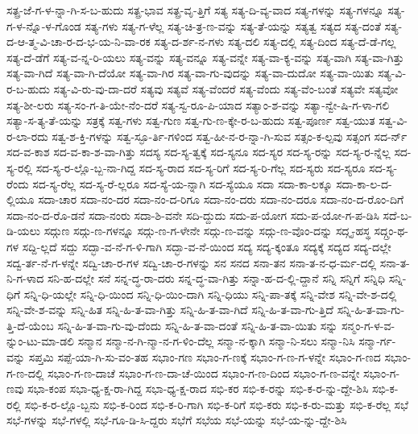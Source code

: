 {ಸತ್ಪ್ರ-ಜೆ-ಗ-ಳ-ನ್ನಾ-ಗಿ-ಸ-ಬ-ಹುದು
ಸತ್ಪ್ರ-ಭಾವ
ಸತ್ಪ್ರ-ವೃ-ತ್ತಿಗೆ
ಸತ್ಯ
ಸತ್ಯ-ದಿ-ವ್ಯ-ವಾದ
ಸತ್ಯ-ಗಳನ್ನು
ಸತ್ಯ-ಗಳನ್ನೂ
ಸತ್ಯ-ಗ-ಳ-ನ್ನೊ-ಳ-ಗೊಂಡ
ಸತ್ಯ-ಗಳು
ಸತ್ಯ-ಗ-ಳೆಲ್ಲ
ಸತ್ಯ-ಚಿ-ತ್ರ-ಣ-ವನ್ನು
ಸತ್ಯ-ತೆ-ಯನ್ನು
ಸತ್ಯತ್ವ
ಸತ್ಯದ
ಸತ್ಯ-ದಂತೆ
ಸತ್ಯ-ದ-ಆ-ತ್ಮ-ವಿ-ಚಾ-ರ-ದ-ಭ-ಯ-ನಿ-ವಾ-ರಕ
ಸತ್ಯ-ದ-ರ್ಶ-ನ-ಗಳು
ಸತ್ಯ-ದಲಿ
ಸತ್ಯ-ದಲ್ಲಿ
ಸತ್ಯ-ದಿಂದ
ಸತ್ಯ-ದೆ-ಡೆ-ಗಲ್ಲ
ಸತ್ಯ-ದೆ-ಡೆಗೆ
ಸತ್ಯ-ವ-ನ್ನ-ರಿ-ಯಲು
ಸತ್ಯ-ವನ್ನು
ಸತ್ಯ-ವನ್ನೂ
ಸತ್ಯ-ವನ್ನೇ
ಸತ್ಯ-ವಾ-ಕ್ಯ-ವನ್ನು
ಸತ್ಯ-ವಾಗಿ
ಸತ್ಯ-ವಾ-ಗಿತ್ತು
ಸತ್ಯ-ವಾ-ಗಿದೆ
ಸತ್ಯ-ವಾ-ಗಿ-ದೆಯೋ
ಸತ್ಯ-ವಾ-ಗಿರ
ಸತ್ಯ-ವಾ-ಗು-ವುದನ್ನು
ಸತ್ಯ-ವಾ-ದುದೋ
ಸತ್ಯ-ವಾ-ಯಿತು
ಸತ್ಯ-ವಿ-ರ-ಬ-ಹುದು
ಸತ್ಯ-ವಿ-ರು-ವು-ದಾ-ದರೆ
ಸತ್ಯವು
ಸತ್ಯವೆ
ಸತ್ಯ-ವೆಂದರೆ
ಸತ್ಯ-ವೆಂದು
ಸತ್ಯ-ವೆಂ-ಬಂತೆ
ಸತ್ಯವೇ
ಸತ್ಯವೋ
ಸತ್ಯ-ಶೀ-ಲರು
ಸತ್ಯ-ಸಂ-ಗ-ತಿ-ಯೇ-ನೆಂ-ದರೆ
ಸತ್ಯ-ಸ್ವ-ರೂ-ಪಿ-ಯಾದ
ಸತ್ಯಾಂ-ಶ-ವನ್ನು
ಸತ್ಯಾ-ನ್ವೇ-ಷಿ-ಗ-ಳಾ-ಗಲಿ
ಸತ್ಯಾ-ಸ-ತ್ಯ-ತೆ-ಯನ್ನು
ಸತ್ರಕ್ಕೆ
ಸತ್ವ-ಗಳು
ಸತ್ವ-ಗುಣ
ಸತ್ವ-ಗು-ಣ-ಕ್ಕೇ-ರ-ಬ-ಹುದು
ಸತ್ವ-ಪೂರ್ಣ
ಸತ್ವ-ಯುತ
ಸತ್ವ-ವಿ-ರ-ಲಾ-ರದು
ಸತ್ವ-ಶ-ಕ್ತಿ-ಗಳನ್ನು
ಸತ್ವ-ಸ್ಫೂ-ರ್ತಿ-ಗಳಿಂದ
ಸತ್ವ-ಹೀ-ನ-ರ-ನ್ನಾ-ಗಿ-ಸುವ
ಸತ್ಸಂ-ಕ-ಲ್ಪವು
ಸತ್ಸಂಗ
ಸದ-ರ್ನ್
ಸದ-ವ-ಕಾಶ
ಸದ-ವ-ಕಾ-ಶ-ವಾ-ಗಿತ್ತು
ಸದಸ್ಯ
ಸದ-ಸ್ಯ-ತ್ವಕ್ಕೆ
ಸದ-ಸ್ಯನೂ
ಸದ-ಸ್ಯರ
ಸದ-ಸ್ಯ-ರನ್ನು
ಸದ-ಸ್ಯ-ರ-ನ್ನೆಲ್ಲ
ಸದ-ಸ್ಯ-ರಲ್ಲಿ
ಸದ-ಸ್ಯ-ರ-ಲ್ಲೊ-ಬ್ಬ-ನಾ-ಗಿದ್ದ
ಸದ-ಸ್ಯ-ರಾದ
ಸದ-ಸ್ಯ-ರಿಗೆ
ಸದ-ಸ್ಯ-ರಿ-ಗೆಲ್ಲ
ಸದ-ಸ್ಯರು
ಸದ-ಸ್ಯರೂ
ಸದ-ಸ್ಯ-ರೆಂದು
ಸದ-ಸ್ಯ-ರೆಲ್ಲ
ಸದ-ಸ್ಯ-ರೆ-ಲ್ಲರೂ
ಸದ-ಸ್ಯೆ-ಯ-ನ್ನಾಗಿ
ಸದ-ಸ್ಯೆಯೂ
ಸದಾ
ಸದಾ-ಕಾ-ಲಕ್ಕೂ
ಸದಾ-ಕಾ-ಲ-ದ-ಲ್ಲಿಯೂ
ಸದಾ-ಚಾರ
ಸದಾ-ನಂ-ದರ
ಸದಾ-ನಂ-ದ-ರಿಗೂ
ಸದಾ-ನಂ-ದರು
ಸದಾ-ನಂ-ದರೂ
ಸದಾ-ನಂ-ದ-ರೊಂ-ದಿಗೆ
ಸದಾ-ನಂ-ದ-ರೊ-ಡನೆ
ಸದಾ-ನಂರು
ಸದಾ-ಶಿ-ವನೇ
ಸದಿ-ದ್ದುದು
ಸದು-ಪ-ಯೋಗ
ಸದು-ಪ-ಯೋ-ಗ-ಪ-ಡಿಸಿ
ಸದೆ-ಬ-ಡಿ-ಯಲು
ಸದ್ಗುಣ
ಸದ್ಗು-ಣ-ಗಳನ್ನೂ
ಸದ್ಗು-ಣ-ಗ-ಳೇನೇ
ಸದ್ಗು-ಣ-ವನ್ನು
ಸದ್ಗು-ಣ-ವೊಂ-ದನ್ನು
ಸದ್ಗೃ-ಹಸ್ಥ
ಸದ್ಗ್ರಂ-ಥ-ಗಳ
ಸದ್ದಿ-ಲ್ಲದೆ
ಸದ್ದು
ಸದ್ಭಾ-ವ-ನೆ-ಗ-ಳಿ-ಗಾಗಿ
ಸದ್ಭಾ-ವ-ನೆ-ಯಿಂದ
ಸದ್ಯ
ಸದ್ಯ-ಕ್ಕಂತೂ
ಸದ್ಯಕ್ಕೆ
ಸದ್ಯದ
ಸದ್ಯ-ದಲ್ಲೇ
ಸದ್ವ-ರ್ತ-ನೆ-ಗ-ಳನ್ನೇ
ಸದ್ವಿ-ಚಾ-ರ-ಗಳ
ಸದ್ವಿ-ಚಾ-ರ-ಗಳನ್ನು
ಸನ
ಸನದ
ಸನಾ-ತನ
ಸನಾ-ತ-ನ-ಧ-ರ್ಮ-ದಲ್ಲಿ
ಸನಾ-ತ-ನಿ-ಗ-ಳಾದ
ಸನಿ-ಹ-ದಲ್ಲೇ
ಸನೆ
ಸನ್ನ-ದ್ಧ-ರಾ-ದರು
ಸನ್ನ-ದ್ಧ-ವಾ-ಗಿತ್ತು
ಸನ್ನಾ-ಹ-ದ-ಲ್ಲಿ-ದ್ದಾನೆ
ಸನ್ನಿ
ಸನ್ನಿಗೆ
ಸನ್ನಿಧಿ
ಸನ್ನಿ-ಧಿಗೆ
ಸನ್ನಿ-ಧಿ-ಯಲ್ಲೇ
ಸನ್ನಿ-ಧಿ-ಯಿಂದ
ಸನ್ನಿ-ಧಿ-ಯಿಂ-ದಾಗಿ
ಸನ್ನಿ-ಧಿಯು
ಸನ್ನಿ-ಪಾ-ತಕ್ಕೆ
ಸನ್ನಿ-ವೇಶ
ಸನ್ನಿ-ವೇ-ಶ-ದಲ್ಲಿ
ಸನ್ನಿ-ವೇ-ಶ-ವನ್ನು
ಸನ್ನಿ-ಹಿತ
ಸನ್ನಿ-ಹಿ-ತ-ವಾ-ಗಿತ್ತು
ಸನ್ನಿ-ಹಿ-ತ-ವಾ-ಗಿದೆ
ಸನ್ನಿ-ಹಿ-ತ-ವಾ-ಗು-ತ್ತಿದೆ
ಸನ್ನಿ-ಹಿ-ತ-ವಾ-ಗು-ತ್ತಿ-ದೆ-ಯೆಂಬ
ಸನ್ನಿ-ಹಿ-ತ-ವಾ-ಗು-ವು-ದೆಂದು
ಸನ್ನಿ-ಹಿ-ತ-ವಾ-ದಂತೆ
ಸನ್ನಿ-ಹಿ-ತ-ವಾ-ಯಿತು
ಸನ್ನು
ಸನ್ಮಂ-ಗ-ಳ-ವ-ನ್ನುಂ-ಟು-ಮಾ-ಡಲಿ
ಸನ್ಮಾನ
ಸನ್ಮಾ-ನ-ಗಿ-ನ್ಮಾ-ನ-ಗ-ಳಿಂ-ದೆಲ್ಲ
ಸನ್ಮಾ-ನ-ಕ್ಕಾಗಿ
ಸನ್ಮಾ-ನಿ-ಸಲು
ಸನ್ಮಾ-ನಿಸಿ
ಸನ್ಮಾ-ರ್ಗ-ವನ್ನು
ಸಪ್ತಮಿ
ಸಪ್ಪೆ-ಯಾ-ಗಿ-ಸು-ವಂ-ತಹ
ಸಭಾಂ-ಗಣ
ಸಭಾಂ-ಗ-ಣಕ್ಕೆ
ಸಭಾಂ-ಗ-ಣ-ಗ-ಳನ್ನೇ
ಸಭಾಂ-ಗ-ಣದ
ಸಭಾಂ-ಗ-ಣ-ದಲ್ಲಿ
ಸಭಾಂ-ಗ-ಣ-ದಾಚೆ
ಸಭಾಂ-ಗ-ಣ-ದಾ-ಚೆ-ಯಿಂದ
ಸಭಾಂ-ಗ-ಣ-ದಿಂದ
ಸಭಾಂ-ಗ-ಣ-ವನ್ನೇ
ಸಭಾಂ-ಗ-ಣವು
ಸಭಾ-ಕಂಪ
ಸಭಾ-ಧ್ಯ-ಕ್ಷ-ರಾ-ಗಿದ್ದ
ಸಭಾ-ಧ್ಯ-ಕ್ಷ-ರಾದ
ಸಭಿ-ಕರ
ಸಭಿ-ಕ-ರನ್ನು
ಸಭಿ-ಕ-ರ-ನ್ನು-ದ್ದೇ-ಶಿಸಿ
ಸಭಿ-ಕ-ರಲ್ಲಿ
ಸಭಿ-ಕ-ರ-ಲ್ಲೊ-ಬ್ಬನು
ಸಭಿ-ಕ-ರಿಂದ
ಸಭಿ-ಕ-ರಿ-ಗಾಗಿ
ಸಭಿ-ಕ-ರಿಗೆ
ಸಭಿ-ಕರು
ಸಭಿ-ಕ-ರು-ಮತ್ತು
ಸಭಿ-ಕ-ರೆಲ್ಲ
ಸಭೆ
ಸಭೆ-ಗಳನ್ನು
ಸಭೆ-ಗಳಲ್ಲಿ
ಸಭೆ-ಗೂ-ಡಿ-ಸಿ-ದ್ದರು
ಸಭೆಗೆ
ಸಭೆಯ
ಸಭೆ-ಯನ್ನು
ಸಭೆ-ಯ-ನ್ನು-ದ್ದೇ-ಶಿಸಿ
}
